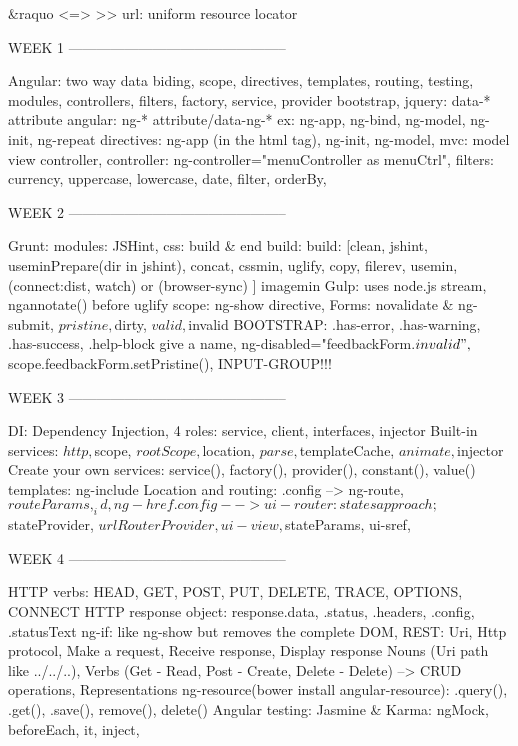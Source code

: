 &raquo <=> >>
url: uniform resource locator

WEEK 1 -----------------------------------------------

Angular: two way data biding, scope, directives, templates, routing, testing, modules, controllers, filters, factory, service, provider
bootstrap, jquery: data-* attribute
angular: ng-* attribute/data-ng-* ex: ng-app, ng-bind, ng-model, ng-init, ng-repeat
directives: ng-app (in the html tag), ng-init, ng-model, 
mvc: model view controller, 
controller: ng-controller="menuController as menuCtrl", 
filters: currency, uppercase, lowercase, date, filter, orderBy, 


WEEK 2 -----------------------------------------------

Grunt: modules: JSHint, css: build & end build:  build: [clean, jshint, useminPrepare(dir in jshint), concat, cssmin, uglify, copy, filerev, usemin,
(connect:dist, watch) or (browser-sync) ] imagemin
Gulp: uses node.js stream, ngannotate() before uglify
scope: ng-show directive, 
Forms: novalidate & ng-submit, $pristine, $dirty, $valid, $invalid BOOTSTRAP: .has-error, .has-warning, .has-success, .help-block
give a name, ng-disabled="feedbackForm.$invalid", $scope.feedbackForm.setPristine(), 
INPUT-GROUP!!!

WEEK 3 -----------------------------------------------

DI: Dependency Injection,
4 roles: service, client, interfaces, injector
Built-in services: $http, $scope, $rootScope, $location, $parse, $templateCache, $animate, $injector
Create your own services: service(), factory(), provider(), constant(), value()
templates: ng-include
Location and routing: 
.config --> ng-route, $routeParams, _id, ng-href
.config --> ui-router: states approach; $stateProvider, $urlRouterProvider, ui-view, $stateParams, ui-sref, 


WEEK 4 -----------------------------------------------

HTTP verbs: HEAD, GET, POST, PUT, DELETE, TRACE, OPTIONS, CONNECT
HTTP response object: response.data, .status, .headers, .config, .statusText
ng-if: like ng-show but removes the complete DOM,
REST: Uri, Http protocol, Make a request, Receive response, Display response
Nouns (Uri path like ../../..), Verbs (Get - Read, Post - Create, Delete - Delete) --> CRUD operations, Representations
ng-resource(bower install angular-resource): .query(), .get(), .save(), remove(), delete()
Angular testing: Jasmine & Karma: ngMock, beforeEach, it, inject, 








